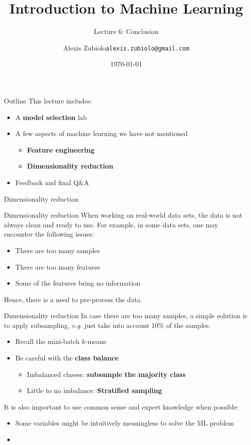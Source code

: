 \documentclass{beamer}
\title[Classification]{Introduction to Machine Learning}
\subtitle{Lecture 6: Conclusion}
\author{Alexis Zubiolo\newline\texttt{alexis.zubiolo@gmail.com}}
\institute{Data Science Team Lead @ Adcash}
\date{\today}
\newcommand{\1}[1]{\mathbbm{1}\left[#1\right]}
\begin{document}
\begin{frame}
  \titlepage
\end{frame}

\begin{frame}{Outline}
This lecture includes:
\begin{itemize}
 \item A \textbf{model selection} lab
 \item A few aspects of machine learning we have not mentioned
 \begin{itemize}
 	\item \textbf{Feature engineering}
 	\item \textbf{Dimensionality reduction}
 \end{itemize}
 \item Feedback and final Q\&A
\end{itemize}
\end{frame}


\begin{frame}
\begin{center}
\Huge{Dimensionality reduction}
\end{center}
\end{frame}

\begin{frame}{Dimensionality reduction}
When working on real-world data sets, the data is not always clean and ready to use.
\vfill
\pause
For example, in some data sets, one may encounter the following issues:
\begin{itemize}
	\item There are too many samples
	\item There are too many features
	\item Some of the features bring no information
\end{itemize}
\vfill
\pause
Hence, there is a need to pre-process the data.
\end{frame}

\begin{frame}{Dimensionality reduction}
In case there are too many samples, a simple solution is to apply subsampling, \textit{e.g.} just take into account 10\% of the samples.
\begin{itemize}
	\item Recall the mini-batch $k$-means
	\item Be careful with the \textbf{class balance}
	\begin{itemize}
		\item Imbalanced classes: \textbf{subsample the majority class}
		\item Little to no imbalance: \textbf{Stratified sampling}
	\end{itemize}
\end{itemize}
\vfill
\pause
It is also important to use common sense and expert knowledge when possible:
\begin{itemize}
	\item Some variables might be intuitively meaningless to solve the ML problem
	\item 
\end{itemize}
\end{frame}
\end{document}
